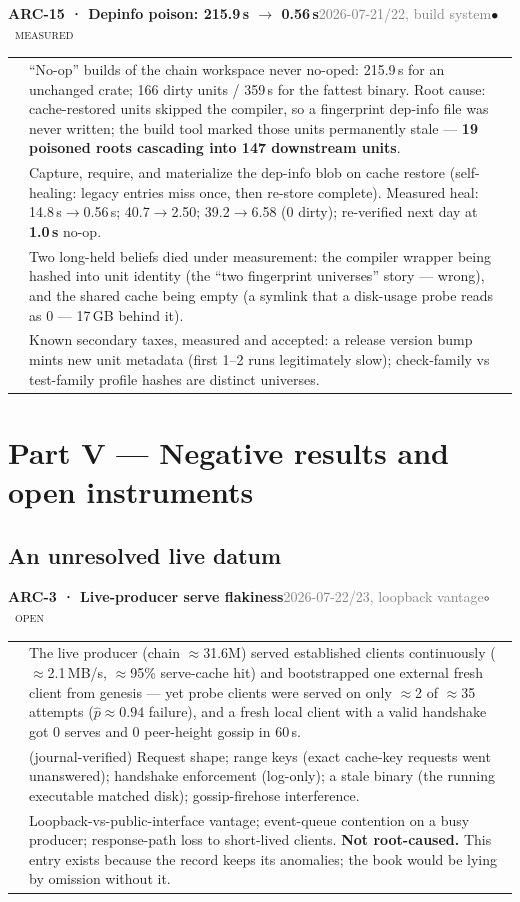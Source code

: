 \documentclass[10pt,a4paper]{article}
\makeatletter
\newcommand{\stM}{\textcolor{sigilcyan}{$\bullet$}~{\scriptsize\textcolor{sigilcyan}{\textsc{measured}}}}
\newcommand{\stO}{\textcolor{sigilamber}{$\circ$}~{\scriptsize\textcolor{sigilamber}{\textsc{open}}}}
\newcommand{\measured}[1]{\textcolor{sigilcyan}{\textbf{#1}}}
\newcommand{\frow}[2]{{\footnotesize\textcolor{gray}{\textsc{#1}}}\;&\small #2\\}
\newenvironment{mentry}[4]{%
\begin{tcolorbox}[enhanced,breakable,colback=white,colframe=slate,boxrule=0.6pt,arc=2pt,
  left=8pt,right=8pt,top=6pt,bottom=6pt,
  borderline west={3pt}{0pt}{sigilcyan!70!slate}]
{\small\textbf{#1 · #2}\hfill{\footnotesize\textcolor{gray}{#3}}\quad#4}\\[4pt]
\begin{tabular}{@{}>{\raggedleft\arraybackslash}p{1.8cm}p{13.2cm}@{}}
}{%
\end{tabular}
\end{tcolorbox}\vspace{2pt}}
\makeatother
\begin{document}
\begin{mentry}{ARC-15}{Depinfo poison: 215.9\,s $\to$ 0.56\,s}{2026-07-21/22, build system}{\stM}
\frow{measured}{``No-op'' builds of the chain workspace never no-oped: 215.9\,s for an
unchanged crate; 166 dirty units / 359\,s for the fattest binary. Root cause: cache-restored
units skipped the compiler, so a fingerprint dep-info file was never written; the build
tool marked those units permanently stale --- \measured{19 poisoned roots cascading into
147 downstream units}.}
\frow{fix}{Capture, require, and materialize the dep-info blob on cache restore
(self-healing: legacy entries miss once, then re-store complete). Measured heal:
14.8\,s$\to$0.56\,s; 40.7$\to$2.50; 39.2$\to$6.58 (0 dirty); re-verified next day at
\measured{1.0\,s} no-op.}
\frow{ruled out}{Two long-held beliefs died under measurement: the compiler wrapper being
hashed into unit identity (the ``two fingerprint universes'' story --- wrong), and the
shared cache being empty (a symlink that a disk-usage probe reads as 0 --- 17\,GB behind
it).}
\frow{residual}{Known secondary taxes, measured and accepted: a release version bump
mints new unit metadata (first 1--2 runs legitimately slow); check-family vs test-family
profile hashes are distinct universes.}
\end{mentry}

\section{Part V --- Negative results and open instruments}
\label{sec:negatives}

\subsection{An unresolved live datum}

\begin{mentry}{ARC-3}{Live-producer serve flakiness}{2026-07-22/23, loopback vantage}{\stO}
\frow{measured}{The live producer (chain $\approx$31.6M) served established clients
continuously ($\approx$2.1\,MB/s, $\approx$95\% serve-cache hit) and bootstrapped one
external fresh client from genesis --- yet probe clients were served on only $\approx$2 of
$\approx$35 attempts ($\hat p \approx 0.94$ failure), and a fresh local client with a valid
handshake got 0 serves and 0 peer-height gossip in 60\,s.}
\frow{ruled out}{(journal-verified) Request shape; range keys (exact cache-key requests
went unanswered); handshake enforcement (log-only); a stale binary (the running executable
matched disk); gossip-firehose interference.}
\frow{not ruled out}{Loopback-vs-public-interface vantage; event-queue contention on a
busy producer; response-path loss to short-lived clients. \textbf{Not root-caused.} This
entry exists because the record keeps its anomalies; the book would be lying by omission
without it.}
\end{mentry}
\end{document}
